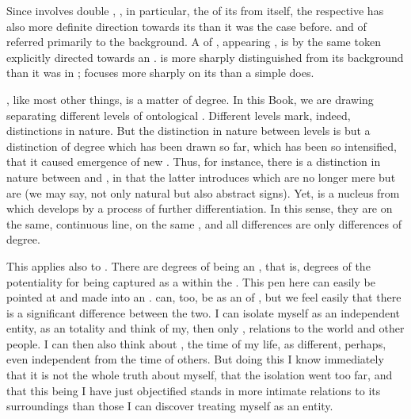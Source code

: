 Since  involves double ,
, in particular, the  of its 
from itself, the respective  has also more definite direction
towards its  than it was the case before.   and
 of  referred primarily to the background.  A
 of , appearing , is by the same token
explicitly directed towards an  .   is more
sharply distinguished from its background than it was in ;
 focuses more sharply on its  than a simple
 does.

\pa {}, like most other things, is a matter of degree.  In this
Book, we are drawing  separating different levels of
ontological .  Different levels mark, indeed, distinctions in
nature.  But the distinction in nature between levels is but a distinction of
degree which has been drawn so far, which has been so intensified, that it
caused emergence of new .  Thus, for instance, there is a
distinction in nature between  and , in that
the latter introduces  which are no longer mere  but are
 (we may say, not only natural but also abstract signs).
Yet,  is a nucleus from which  develops by a
process of further differentiation.  In this sense, they are on the same,
continuous line, on the same , and all differences are only
differences of degree.

This applies also to .  There are degrees of being an
, that is, degrees of the potentiality for being captured as a
 within the \hoa.  This pen here can easily be pointed at and made into
an .   can, too, be  as an
 of , but we feel easily that there is a significant
difference between the two. I can isolate myself as an independent entity, as an
 totality and think of my, then only , relations to
the world and other people. I can then also think about , the time
of my life, as different, perhaps, even independent from the time of others. But
doing this I know immediately that it is not the whole truth about myself, that
the isolation went too far, and that this being I have just {objectified} stands
in more intimate relations to its surroundings than those I can discover
treating myself as an  entity.

